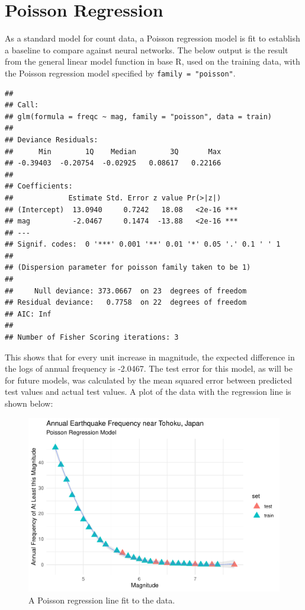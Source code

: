 
\section{Poisson Regression}
As a standard model for count data, a Poisson regression model is fit to establish a baseline to compare against neural networks.  The below output is the result from the general linear model function in base R, used on the training data, with the Poisson regression model specified by \texttt{family = "poisson"}.

\begin{verbatim}
## 
## Call:
## glm(formula = freqc ~ mag, family = "poisson", data = train)
## 
## Deviance Residuals: 
##      Min        1Q    Median        3Q       Max  
## -0.39403  -0.20754  -0.02925   0.08617   0.22166  
## 
## Coefficients:
##             Estimate Std. Error z value Pr(>|z|)    
## (Intercept)  13.0940     0.7242   18.08   <2e-16 ***
## mag          -2.0467     0.1474  -13.88   <2e-16 ***
## ---
## Signif. codes:  0 '***' 0.001 '**' 0.01 '*' 0.05 '.' 0.1 ' ' 1
## 
## (Dispersion parameter for poisson family taken to be 1)
## 
##     Null deviance: 373.0667  on 23  degrees of freedom
## Residual deviance:   0.7758  on 22  degrees of freedom
## AIC: Inf
## 
## Number of Fisher Scoring iterations: 3
\end{verbatim}

This shows that for every unit increase in magnitude, the expected difference in the logs of annual frequency is -2.0467.  The test error for this model, as will be for future models, was calculated by the mean squared error between predicted test values and actual test values. A plot of the data with the regression line is shown below:


\begin{figure}[H]
    \center
    \includegraphics[width=0.75\linewidth]{Appendix_eq_files/figure-latex/unnamed-chunk-3-1.pdf}
    \caption{\footnotesize{A Poisson regression line fit to the data.}}
    \label{tohoku_unfit}
\end{figure}

